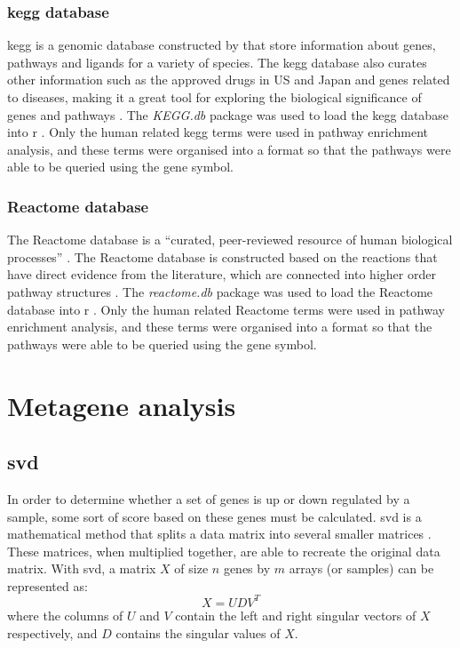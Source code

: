\subsubsection{\gls{kegg} database}
\label{ssub:kegg_database}

\gls{kegg} is a genomic database constructed by \citet{Kanehisa2000} that store information about genes, pathways and ligands for a variety of species.
The \gls{kegg} database also curates other information such as the approved drugs in US and Japan and genes related to diseases, making it a great tool for exploring the biological significance of genes and pathways \citep{Kanehisa2008}.
The \textit{KEGG.db} package was used to load the \gls{kegg} database into \gls{r} \citep{kegg}.
Only the human related \gls{kegg} terms were used in pathway enrichment analysis, and these terms were organised into a format so that the pathways were able to be queried using the gene symbol.

\subsubsection{Reactome database}
\label{ssub:Reactome_database}

The Reactome database is a ``curated, peer-reviewed resource of human biological processes'' \citep{Joshi2005}.
The Reactome database is constructed based on the reactions that have direct evidence from the literature, which are connected into higher order pathway structures \citep{Joshi2005}.
The \textit{reactome.db} package was used to load the Reactome database into \gls{r} \citep{reactome}.
Only the human related Reactome terms were used in pathway enrichment analysis, and these terms were organised into a format so that the pathways were able to be queried using the gene symbol.

\section{Metagene analysis}
\label{sec:metagene_analysis}

\subsection{\Gls{svd}}
\label{sub:svd}

In order to determine whether a set of genes is up or down regulated by a sample, some sort of score based on these genes must be calculated.
\Gls{svd} is a mathematical method that splits a data matrix into several smaller matrices \citep{Golub1970}.
These matrices, when multiplied together, are able to recreate the original data matrix.
With \gls{svd}, a matrix $X$ of size $n$ genes by $m$ arrays (or samples) can be represented as:
\begin{equation}
	\label{eq:svd}
	X = UDV^T
\end{equation}
where the columns of $U$ and $V$ contain the left and right singular vectors of $X$ respectively, and $D$ contains the singular values of $X$.


